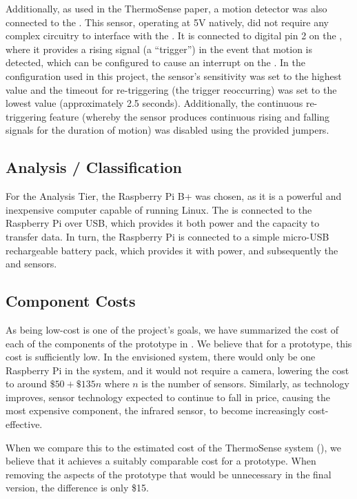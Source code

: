\documentclass[../thesis/thesis.tex]{subfiles}
\begin{document}
Additionally, as used in the ThermoSense paper, a \pir motion detector \cite{AdafruitPIR} was also connected to the \ard. This sensor, operating at 5V natively, did not require any complex circuitry to interface with the \ard. It is connected to digital pin 2 on the \ard, where it provides a rising signal (a ``trigger'') in the event that motion is detected, which can be configured to cause an interrupt on the \ard. In the configuration used in this project, the sensor's sensitivity was set to the highest value and the timeout for re-triggering (the trigger reoccurring) was set to the lowest value (approximately 2.5 seconds). Additionally, the continuous re-triggering feature (whereby the sensor produces continuous rising and falling signals for the duration of motion) was disabled using the provided jumpers. 

\subsection{Analysis / Classification}

For the Analysis Tier, the Raspberry Pi B+ was chosen, as it is a powerful and inexpensive computer capable of running Linux. The \ard is connected to the Raspberry Pi over USB, which provides it both power and the capacity to transfer data. In turn, the Raspberry Pi is connected to a simple micro-USB rechargeable battery pack, which provides it with power, and subsequently the \ard and sensors.

\subsection{Component Costs}
\label{subsec:cost}

As being low-cost is one of the project's goals, we have summarized the cost of each of the components of the prototype in . We believe that for a prototype, this cost is sufficiently low. In the envisioned system, there would only be one Raspberry Pi in the system, and it would not require a camera, lowering the cost to around $\$50 + \$135n$ where $n$ is the number of sensors. Similarly, as technology improves, sensor technology expected to continue to fall in price, causing the most expensive component, the infrared sensor, to become increasingly cost-effective.

When we compare this to the estimated cost of the ThermoSense system (), we believe that it achieves a suitably comparable cost for a prototype. When removing the aspects of the prototype that would be unnecessary in the final version, the difference is only \$15.
\end{document}
